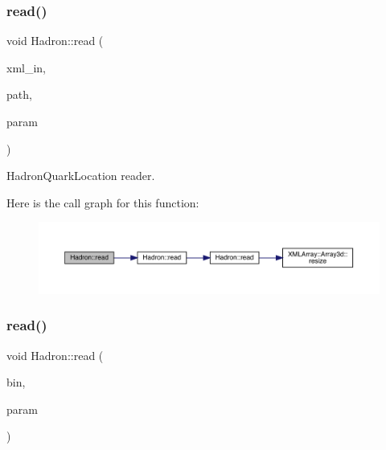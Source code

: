 \subsubsection{\texorpdfstring{read()}{read()}\hspace{0.1cm}{\footnotesize\ttfamily [50/94]}}
{\footnotesize\ttfamily void Hadron\+::read (\begin{DoxyParamCaption}\item[{\mbox{\hyperlink{classADATXML_1_1XMLReader}{X\+M\+L\+Reader}} \&}]{xml\+\_\+in,  }\item[{const std\+::string \&}]{path,  }\item[{\mbox{\hyperlink{structHadron_1_1HadronQuarkLocation__t}{Hadron\+Quark\+Location\+\_\+t}} \&}]{param }\end{DoxyParamCaption})}



Hadron\+Quark\+Location reader. 

Here is the call graph for this function\+:
\nopagebreak
\begin{figure}[H]
\begin{center}
\leavevmode
\includegraphics[width=350pt]{d1/daf/namespaceHadron_a48b9ff1049a4c339c032065b538ed41f_cgraph}
\end{center}
\end{figure}
\mbox{\label{namespaceHadron_a9478eee791b9cb2c8523893a334602e2}} 
\subsubsection{\texorpdfstring{read()}{read()}\hspace{0.1cm}{\footnotesize\ttfamily [51/94]}}
{\footnotesize\ttfamily void Hadron\+::read (\begin{DoxyParamCaption}\item[{\mbox{\hyperlink{classADATIO_1_1BinaryReader}{Binary\+Reader}} \&}]{bin,  }\item[{\mbox{\hyperlink{structHadron_1_1KeyHadronNPartNPtCorr__t_1_1NPoint__t}{Key\+Hadron\+N\+Part\+N\+Pt\+Corr\+\_\+t\+::\+N\+Point\+\_\+t}} \&}]{param }\end{DoxyParamCaption})}



